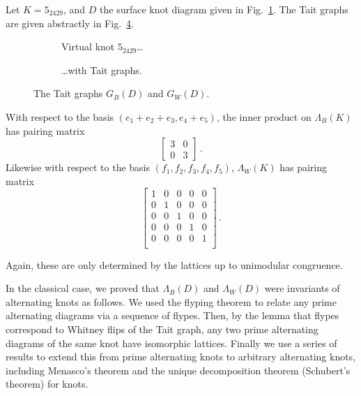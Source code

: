 \documentclass[12pt]{report}
\theoremstyle{upright}
\begin{document}
Let $K = 5_{2429}$, and $D$ the surface knot diagram given in Fig.~\ref{fig:5-2429-vknot}. The Tait graphs are given abstractly in Fig.~\ref{fig:5-2429-taits-abstract}.

\begin{figure}[hbt]
	\hspace*{\fill}
	\begin{subfigure}[b]{0.45 \textwidth}
		\centering
		\def\svgscale{0.35}
		
		\caption{Virtual knot $5_{2429}$\ldots}
		\label{fig:5-2429-vknot}
	\end{subfigure}
	\hspace*{\fill}
	\begin{subfigure}[b]{0.45 \textwidth}
		\centering
		\def\svgscale{0.35}
		
		\caption{\ldots with Tait graphs.}
		\label{fig:5-2429-taits}
	\end{subfigure}
	\hspace*{\fill}
	\caption{}
	\label{fig:5-2429-example}
\end{figure}

\begin{figure}[hbt]
	\centering
	\def\svgscale{0.4}
	
	\caption{The Tait graphs $G_{B}(D)$ and $G_{W}(D)$.}
	\label{fig:5-2429-taits-abstract}
\end{figure}

With respect to the basis $(e_{1} + e_{2} + e_{3}, e_{4} + e_{5})$, the inner product on $\Lambda_{B}(K)$ has pairing matrix
\[\begin{bmatrix}
3 & 0 \\
0 & 3
\end{bmatrix}\,.\]
Likewise with respect to the basis $(f_{1}, f_{2}, f_{3}, f_{4}, f_{5})$, $\Lambda_{W}(K)$ has pairing matrix
\[\begin{bmatrix}
1 & 0 & 0 & 0 & 0\\
0 & 1 & 0 & 0 & 0\\
0 & 0 & 1 & 0 & 0\\
0 & 0 & 0 & 1 & 0\\
0 & 0 & 0 & 0 & 1\\
\end{bmatrix}\,.\]

Again, these are only determined by the lattices up to unimodular congruence.

In the classical case, we proved that $\Lambda_{B}(D)$ and $\Lambda_{W}(D)$ were invariants of alternating knots as follows. We used the flyping theorem to relate any prime alternating diagrams via a sequence of flypes. Then, by the lemma that flypes correspond to Whitney flips of the Tait graph, any two prime alternating diagrams of the same knot have isomorphic lattices. Finally we use a series of results to extend this from prime alternating knots to arbitrary alternating knots, including Menasco's theorem and the unique decomposition theorem (Schubert's theorem) for knots.
\end{document}
